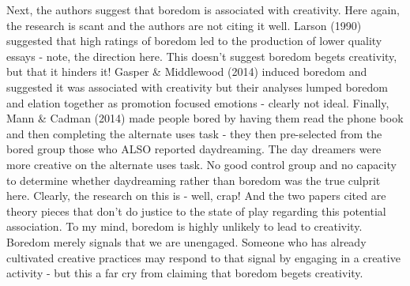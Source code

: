 \documentclass[utf8]{article}
\begin{document}
        
         
        Next, the authors suggest that boredom is associated with creativity. Here again, the research is scant and the authors are not citing it well. Larson (1990) suggested that high ratings of boredom led to the production of lower quality essays - note, the direction here. This doesn't suggest boredom begets creativity, but that it hinders it! Gasper \& Middlewood (2014) induced boredom and suggested it was associated with creativity but their analyses lumped boredom and elation together as promotion focused emotions - clearly not ideal. Finally, Mann \& Cadman (2014) made people bored by having them read the phone book and then completing the alternate uses task - they then pre-selected from the bored group those who ALSO reported daydreaming. The day dreamers were more creative on the alternate uses task. No good control group and no capacity to determine whether daydreaming rather than boredom was the true culprit here. Clearly, the research on this is - well, crap! And the two papers cited are theory pieces that don't do justice to the state of play regarding this potential association. To my mind, boredom is highly unlikely to lead to creativity. Boredom merely signals that we are unengaged. Someone who has already cultivated creative practices may respond to that signal by engaging in a creative activity - but this a far cry from claiming that boredom begets creativity.
        
        
         
\end{document}
